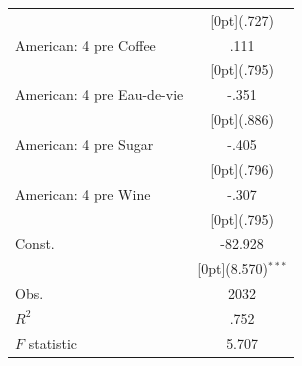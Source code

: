 \documentclass[12pt,a4paper,titlepage]{article}
\begin{document}
{\begin{tabular*}{\textwidth}{@{\extracolsep{\fill}}lc}
&	\raisebox{.7ex}[0pt]{\scriptsize (.727)} \\
American: 4 pre Coffee &	.111 \\
&	\raisebox{.7ex}[0pt]{\scriptsize (.795)} \\
American: 4 pre Eau-de-vie &	-.351 \\
&	\raisebox{.7ex}[0pt]{\scriptsize (.886)} \\
American: 4 pre Sugar &	-.405 \\
&	\raisebox{.7ex}[0pt]{\scriptsize (.796)} \\
American: 4 pre Wine &	-.307 \\
&	\raisebox{.7ex}[0pt]{\scriptsize (.795)} \\
Const. &	-82.928 \\
&	\raisebox{.7ex}[0pt]{\scriptsize (8.570)$^{***}$} \\
Obs. &	2032 \\
$ R^2$ &	.752 \\
$ F$ statistic &	5.707 \\
\hline\hline	
\end{tabular*}%

\newpage
}
\end{document}

